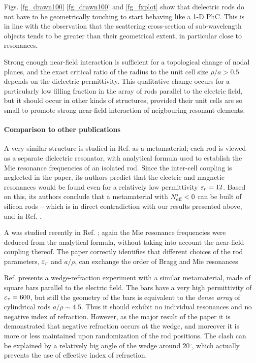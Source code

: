 Figs. \ref{fg_drawn100} \ref{fg_drawn100} and \ref{fg_fxplot} show that dielectric rods do not have to be geometrically touching to start behaving like a 1-D PhC. This is in line with the observation that the scattering cross-section of sub-wavelength objects tends to be greater than their geometrical extent, in particular close to resonances.

Strong enough near-field interaction is sufficient for a topological change of nodal planes, and the exact critical ratio of the radius to the unit cell size $\rho/a > 0.5$ depends on the dielectric permittivity. This qualitative change occurs for a particularly low filling fraction in the array of rods parallel to the electric field, but it should occur in other kinds of structures, provided their unit cells are so small to promote strong near-field interaction of neigbouring resonant elements.

\paragraph{Comparison to other publications} %
A very similar structure  is studied in Ref. \cite{vynck2009all} as a metamaterial; each rod is viewed as a separate dielectric resonator, with analytical formula used to establish the Mie resonance frequencies of an isolated rod. Since the inter-cell coupling is neglected in the paper, its authors predict that the electric and magnetic resonances would be found even for a relatively low permittivity $\varepsilon_r = 12$. Based on this, its authors conclude that a metamaterial with $N_{\text{eff} }'<0$ can be built of silicon rods -- which is in direct contradiction with our results presented above, and in Ref. \cite{dominec2014transition}.

A was studied recently in Ref. \cite{rybin2014photonic}; again the Mie resonance frequencies were deduced from the analytical formula, without taking into account the near-field coupling thereof. The paper correctly identifies that different choices of the rod parameters, $\varepsilon_r$ and $a/\rho$, can exchange the order of Bragg and Mie resonances 


Ref. \cite{peng2007} presents a wedge-refraction experiment with a similar metamaterial, made of square bars parallel to the electric field. The bars have a very high permittivity of $\varepsilon_r=600$, but still the geometry of the bars is equivalent to the \textit{dense array} of cylindrical rods $a/\rho \sim 4.5$. Thus it should exhibit no individual resonances and no negative index of refraction. However, as the major result of the paper \cite[Fig. 3bc]{peng2007} it is demonstrated that negative refraction occurs at the wedge, and moreover it is more or less maintained upon randomization of the rod positions.
The clash can be explained by a relatively big angle of the wedge around 20$^\circ$, which actually prevents the use of effective index of refraction. %

